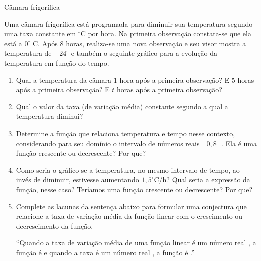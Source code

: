 \begin{task}{Câmara frigorífica}
\label{ativ-camara}


Uma câmara frigorífica está programada para diminuir sua temperatura segundo uma taxa constante em \(^\circ\)C por hora. Na primeira observação constata-se que ela está a \(0^\circ\) C. Após \(8\) horas, realiza-se uma nova observação e seu visor mostra a temperatura de \(-24^\circ\) e também o seguinte gráfico para a evolução da temperatura em função do tempo.

\begin{figure}[H]
\centering

\end{figure}
\begin{enumerate}
\item {} 
Qual a temperatura da câmara \(1\) hora após a primeira observação? E \(5\) horas após a primeira observação? E \(t\) horas após a primeira observação?

\item {} 
Qual o valor da taxa (de variação média) constante segundo a qual a temperatura diminui?

\item {} 
Determine a função que relaciona temperatura e tempo nesse contexto, considerando para seu domínio o intervalo de números reais \([0,8]\). Ela é uma função crescente ou decrescente? Por que?

\item {} 
Como seria o gráfico se a temperatura, no mesmo intervalo de tempo, ao invés de diminuir, estivesse aumentando \(1{,}5^\circ\)C/h? Qual seria a expressão da função, nesse caso? Teríamos uma função crescente ou decrescente? Por que?

\item {} 
Complete as lacunas da sentença abaixo para formular uma conjectura que relacione a taxa de variação média da função linear com o crescimento ou decrescimento da função.

“Quando a taxa de variação média de uma função linear é um número real \makebox[6em]{\hrulefill}, a função é \makebox[8em]{\hrulefill} e quando a taxa é um número real \makebox[8em]{\hrulefill}, a função é \makebox[8em]{\hrulefill}.”

\end{enumerate}
\end{task}

